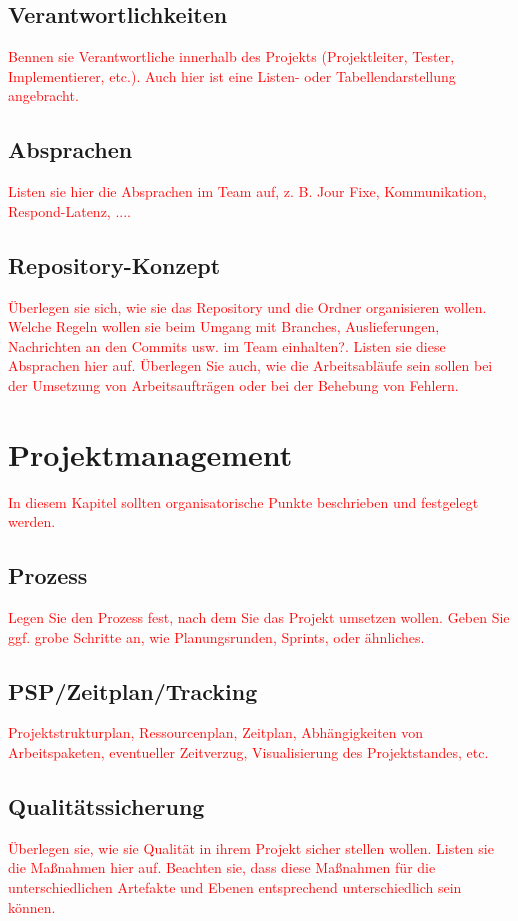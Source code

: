 \documentclass[a4paper, 11pt]{article}
\begin{document}
\subsection{Verantwortlichkeiten}
\textcolor{red}{Bennen sie Verantwortliche innerhalb des Projekts (Projektleiter, Tester, Implementierer, etc.). Auch hier ist eine Listen- oder Tabellendarstellung angebracht.}

\subsection{Absprachen}
\textcolor{red}{Listen sie hier die Absprachen im Team auf, z. B. Jour Fixe, Kommunikation, Respond-Latenz, ....}

\subsection{Repository-Konzept}
\textcolor{red}{Überlegen sie sich, wie sie das Repository und die Ordner organisieren wollen. Welche Regeln wollen sie beim Umgang mit Branches, Auslieferungen, Nachrichten an den Commits usw. im Team einhalten?. Listen sie diese Absprachen hier auf. Überlegen Sie auch, wie die Arbeitsabläufe sein sollen bei der Umsetzung von Arbeitsaufträgen oder bei der Behebung von Fehlern.}

\section{Projektmanagement}
\textcolor{red}{In diesem Kapitel sollten organisatorische Punkte beschrieben und festgelegt werden.}

\subsection{Prozess}
\textcolor{red}{Legen Sie den Prozess fest, nach dem Sie das Projekt umsetzen wollen. Geben Sie ggf. grobe Schritte an, wie Planungsrunden, Sprints, oder ähnliches.}

\subsection{PSP/Zeitplan/Tracking}
\textcolor{red}{Projektstrukturplan, Ressourcenplan, Zeitplan, Abhängigkeiten von Arbeitspaketen, eventueller Zeitverzug, Visualisierung des Projektstandes, etc.}

\subsection{Qualitätssicherung}
\textcolor{red}{Überlegen sie, wie sie Qualität in ihrem Projekt sicher stellen wollen. Listen sie die Maßnahmen hier auf. Beachten sie, dass diese Maßnahmen für die unterschiedlichen Artefakte und Ebenen entsprechend unterschiedlich sein können.}
\end{document}
